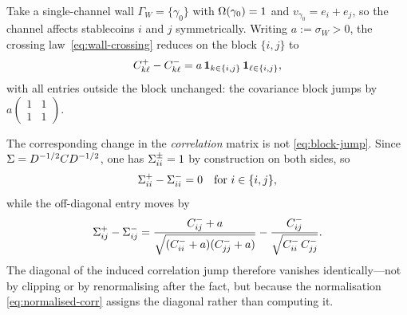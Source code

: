 \begin{remark}\label{rem:small-cases}
Take a single-channel wall $\Gamma_W = \{\gamma_0\}$ with $\Omega(\gamma_0) = 1$ and $v_{\gamma_0} = e_i + e_j$, so the channel affects stablecoins $i$ and $j$ symmetrically. Writing $a := \sigma_W > 0$, the crossing law~\eqref{eq:wall-crossing} reduces on the block $\{i,j\}$ to
\begin{equation}\label{eq:block-jump}
C^+_{k\ell} - C^-_{k\ell} = a\,\mathbf{1}_{k \in \{i,j\}}\,\mathbf{1}_{\ell \in \{i,j\}},
\end{equation}
with all entries outside the block unchanged: the covariance block jumps by $a\begin{pmatrix}1&1\\1&1\end{pmatrix}$.

The corresponding change in the \emph{correlation} matrix is not \eqref{eq:block-jump}. Since $\Sigma = D^{-1/2}C D^{-1/2}$, one has $\Sigma^\pm_{ii} = 1$ by construction on both sides, so
\begin{equation}\label{eq:block-jump-corr}
\Sigma^+_{ii} - \Sigma^-_{ii} = 0 \quad\text{for } i \in \{i,j\},
\end{equation}
while the off-diagonal entry moves by
\begin{equation}\label{eq:block-jump-corr-off}
\Sigma^+_{ij} - \Sigma^-_{ij}
= \frac{C^-_{ij} + a}{\sqrt{(C^-_{ii}+a)(C^-_{jj}+a)}} - \frac{C^-_{ij}}{\sqrt{C^-_{ii}\,C^-_{jj}}} .
\end{equation}
The diagonal of the induced correlation jump therefore vanishes identically---not by clipping or by renormalising after the fact, but because the normalisation \eqref{eq:normalised-corr} assigns the diagonal rather than computing it.


\end{remark}
